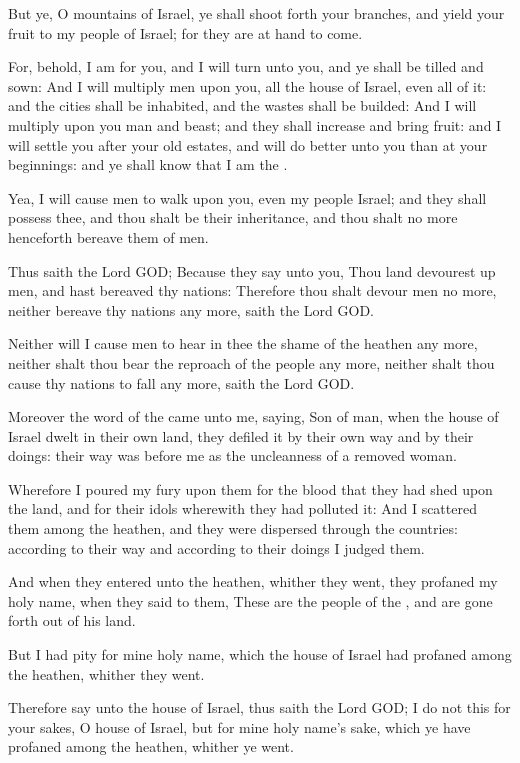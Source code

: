 \verse But ye, O mountains of Israel, ye shall shoot forth your branches, and yield your fruit to my people of Israel; for they are at hand to come.

\verse For, behold, I am for you, and I will turn unto you, and ye shall be tilled and sown: \verse And I will multiply men upon you, all the house of Israel, even all of it: and the cities shall be inhabited, and the wastes shall be builded: \verse And I will multiply upon you man and beast; and they shall increase and bring fruit: and I will settle you after your old estates, and will do better unto you than at your beginnings: and ye shall know that I am the \LORD.

\verse Yea, I will cause men to walk upon you, even my people Israel; and they shall possess thee, and thou shalt be their inheritance, and thou shalt no more henceforth bereave them of men.

\verse Thus saith the Lord GOD; Because they say unto you, Thou land devourest up men, and hast bereaved thy nations: \verse Therefore thou shalt devour men no more, neither bereave thy nations any more, saith the Lord GOD.

\verse Neither will I cause men to hear in thee the shame of the heathen any more, neither shalt thou bear the reproach of the people any more, neither shalt thou cause thy nations to fall any more, saith the Lord GOD.

\verse Moreover the word of the \LORD came unto me, saying, \verse Son of man, when the house of Israel dwelt in their own land, they defiled it by their own way and by their doings: their way was before me as the uncleanness of a removed woman.

\verse Wherefore I poured my fury upon them for the blood that they had shed upon the land, and for their idols wherewith they had polluted it: \verse And I scattered them among the heathen, and they were dispersed through the countries: according to their way and according to their doings I judged them.

\verse And when they entered unto the heathen, whither they went, they profaned my holy name, when they said to them, These are the people of the \LORD, and are gone forth out of his land.

\verse But I had pity for mine holy name, which the house of Israel had profaned among the heathen, whither they went.

\verse Therefore say unto the house of Israel, thus saith the Lord GOD; I do not this for your sakes, O house of Israel, but for mine holy name's sake, which ye have profaned among the heathen, whither ye went.

